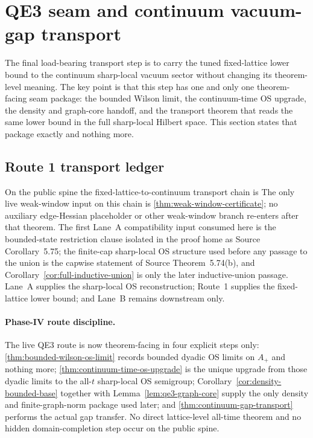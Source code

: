 \section{QE3 seam and continuum vacuum-gap transport}\label{sec:qe3-transport}

The final load-bearing transport step is to carry the tuned fixed-lattice lower bound to the continuum sharp-local vacuum sector without changing its theorem-level meaning. The key point is that this step has one and only one theorem-facing seam package: the bounded Wilson limit, the continuum-time OS upgrade, the density and graph-core handoff, and the transport theorem that reads the same lower bound in the full sharp-local Hilbert space. This section states that package exactly and nothing more.

\subsection{Route 1 transport ledger}

On the public spine the fixed-lattice-to-continuum transport chain is
The only live weak-window input on this chain is \cref{thm:weak-window-certificate}; no auxiliary edge-Hessian placeholder or other weak-window branch re-enters after that theorem. The first Lane~A compatibility input consumed here is the bounded-state restriction clause isolated in the proof home as Source Corollary~5.75; the finite-cap sharp-local OS structure used before any passage to the union is the capwise statement of Source Theorem~5.74(b), and Corollary~\ref{cor:full-inductive-union} is only the later inductive-union passage. Lane~A supplies the sharp-local OS reconstruction; Route~1 supplies the fixed-lattice lower bound; and Lane~B remains downstream only.

\paragraph{Phase-IV route discipline.}
The live QE3 route is now theorem-facing in four explicit steps only: \cref{thm:bounded-wilson-os-limit} records bounded dyadic OS limits on $A_+$ and nothing more; \cref{thm:continuum-time-os-upgrade} is the unique upgrade from those dyadic limits to the all-$t$ sharp-local OS semigroup; Corollary~\ref{cor:density-bounded-base} together with Lemma~\ref{lem:qe3-graph-core} supply the only density and finite-graph-norm package used later; and \cref{thm:continuum-gap-transport} performs the actual gap transfer. No direct lattice-level all-time theorem and no hidden domain-completion step occur on the public spine.

